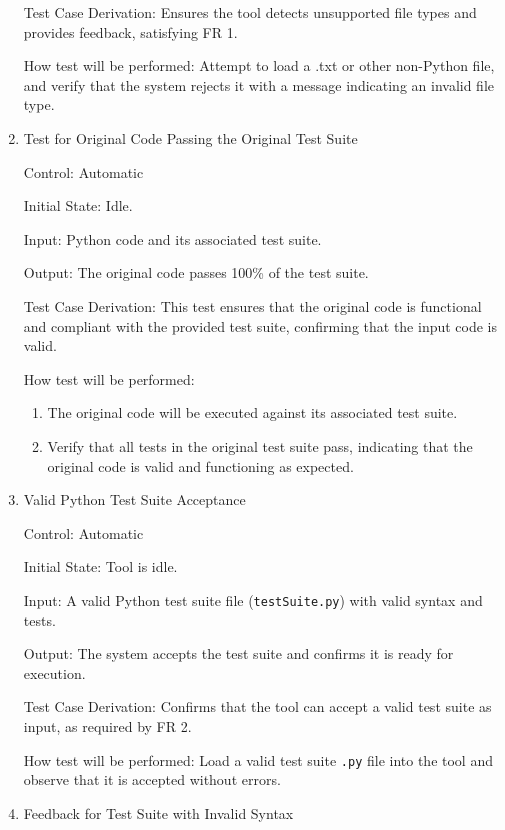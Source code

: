 \documentclass[12pt, titlepage]{article}
\begin{document}
\begin{enumerate}
Test Case Derivation: Ensures the tool detects unsupported file types and provides feedback, satisfying FR 1.

How test will be performed: Attempt to load a .txt or other non-Python file, and verify that the system rejects it with a message indicating an invalid file type.


\item{Test for Original Code Passing the Original Test Suite\\}

Control: Automatic

Initial State: Idle.

Input: Python code and its associated test suite.

Output: The original code passes 100\% of the test suite.

Test Case Derivation:  This test ensures that the original code is functional and compliant with the provided test suite, confirming that the input code is valid.

How test will be performed: 
\begin{enumerate}
  \item The original code will be executed against its associated test suite.
  \item Verify that all tests in the original test suite pass, indicating that the original code is valid and functioning as expected.
\end{enumerate}

 \item{Valid Python Test Suite Acceptance\\}

    Control: Automatic

    Initial State: Tool is idle.

    Input: A valid Python test suite file (\texttt{testSuite.py}) with valid syntax and tests.

    Output: The system accepts the test suite and confirms it is ready for execution.

    Test Case Derivation: Confirms that the tool can accept a valid test suite as input, as required by FR 2.

    How test will be performed: Load a valid test suite \texttt{.py} file into the tool and observe that it is accepted without errors.

    \item{Feedback for Test Suite with Invalid Syntax\\}


\end{enumerate}
\end{document}
